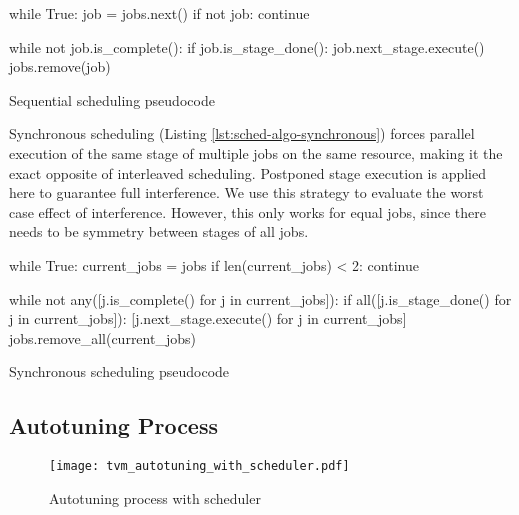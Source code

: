 \begin{listing}
\begin{pythoncode}
while True:
    job = jobs.next()
    if not job:
        continue

    while not job.is_complete():
        if job.is_stage_done():
            job.next_stage.execute()
    jobs.remove(job)
\end{pythoncode}
\unskip
\caption{Sequential scheduling pseudocode}
\label{lst:sched-algo-sequential}
\end{listing}

Synchronous scheduling (Listing \ref{lst:sched-algo-synchronous}) forces parallel execution of the same stage of multiple jobs on the same resource, making it the exact opposite of interleaved scheduling. Postponed stage execution is applied here to guarantee full interference. We use this strategy to evaluate the worst case effect of interference. However, this only works for equal jobs, since there needs to be symmetry between stages of all jobs.

\begin{listing}
\begin{pythoncode}
while True:
    current_jobs = jobs
    if len(current_jobs) < 2:
        continue

    while not any([j.is_complete() for j in current_jobs]):
        if all([j.is_stage_done() for j in current_jobs]):
            [j.next_stage.execute() for j in current_jobs]
    jobs.remove_all(current_jobs)
\end{pythoncode}
\unskip
\caption{Synchronous scheduling pseudocode}
\label{lst:sched-algo-synchronous}
\end{listing}

\subsection{Autotuning Process}
\begin{figure}[ht]
	\centering
	\texttt{[image: tvm\_autotuning\_with\_scheduler.pdf]}%
	\caption{Autotuning process with scheduler}
	\label{fig:tvm-autotuning-with-scheduler}
\end{figure}

